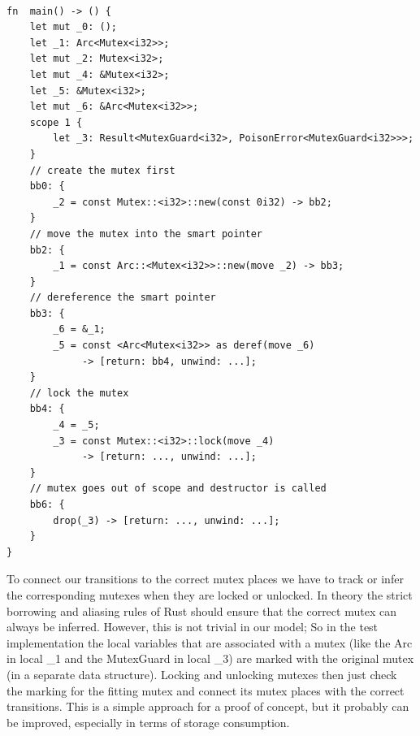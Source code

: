 \begin{lstlisting}

fn  main() -> () {
    let mut _0: ();
    let _1: Arc<Mutex<i32>>;
    let mut _2: Mutex<i32>;
    let mut _4: &Mutex<i32>;
    let _5: &Mutex<i32>;
    let mut _6: &Arc<Mutex<i32>>;
    scope 1 {
        let _3: Result<MutexGuard<i32>, PoisonError<MutexGuard<i32>>>; 
    }
    // create the mutex first
    bb0: {
        _2 = const Mutex::<i32>::new(const 0i32) -> bb2; 
    }
    // move the mutex into the smart pointer
    bb2: {
        _1 = const Arc::<Mutex<i32>>::new(move _2) -> bb3; 
    }
    // dereference the smart pointer
    bb3: {
        _6 = &_1;                        
        _5 = const <Arc<Mutex<i32>> as deref(move _6) 
             -> [return: bb4, unwind: ...]; 
    }
    // lock the mutex
    bb4: {
        _4 = _5;                         
        _3 = const Mutex::<i32>::lock(move _4) 
             -> [return: ..., unwind: ...]; 
    }
    // mutex goes out of scope and destructor is called
    bb6: {
        drop(_3) -> [return: ..., unwind: ...];
    }
}
\end{lstlisting}

To connect our transitions to the correct mutex places we have to track or infer the corresponding mutexes when they are locked or unlocked.
In theory the strict borrowing and aliasing rules of Rust should ensure that the correct mutex can always be inferred.
However, this is not trivial in our model; So in the test implementation the local variables that are associated with a mutex (like the Arc in local \_1 and the MutexGuard in local \_3) are marked with the original mutex (in a separate data structure).
Locking and unlocking mutexes then just check the marking for the fitting mutex and connect its mutex places with the correct transitions.
This is a simple approach for a proof of concept, but it probably can be improved, especially in terms of storage consumption.
